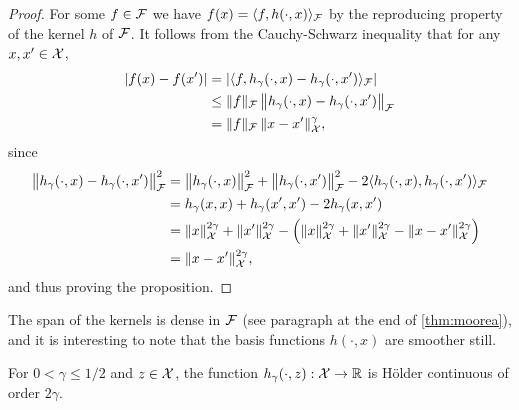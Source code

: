 \begin{proof}
  For some $f \in {\mathcal F}$ we have $f(x) = \langle f,h(\cdot,x)\rangle_{\mathcal F}$ by the reproducing property of the kernel $h$ of ${\mathcal F}$.
  It follows from the Cauchy-Schwarz inequality that for any $x,x'\in{\mathcal X}$,
  \begin{align*}
    \vert f(x) - f(x') \vert 
    &= \vert \langle f,h_\gamma(\cdot,x) - h_\gamma(\cdot,x')\rangle_{\mathcal F} \vert \\
    &\leq \lVert f\rVert_{\mathcal F} \, \big\Vert h_\gamma(\cdot,x) - h_\gamma(\cdot,x') \big\Vert_{\mathcal F} \\
    &= \lVert f\rVert_{\mathcal F} \, \lVert x-x'\rVert_{\mathcal X}^{\gamma},
  \end{align*}
  since
  \begin{align*}
    \big\Vert h_\gamma(\cdot,x) - h_\gamma(\cdot,x') \big\Vert_{\mathcal F} ^2
    &= \big\Vert h_\gamma(\cdot,x) \big\Vert_{\mathcal F} ^2 + \big\Vert h_\gamma(\cdot,x') \big\Vert_{\mathcal F} ^2 - 2 \langle h_\gamma(\cdot,x),h_\gamma(\cdot,x')\rangle_{\mathcal F} \\
    &= h_\gamma(x,x) + h_\gamma(x',x') - 2 h_\gamma(x,x') \\
    &= \lVert x\rVert_{\mathcal X}^{2\gamma} + \lVert x'\rVert_{\mathcal X}^{2\gamma} - \left( \lVert x\rVert_{\mathcal X}^{2\gamma} + \lVert x'\rVert_{\mathcal X}^{2\gamma} - \lVert x-x'\rVert_{\mathcal X}^{2\gamma} \right) \\
    &= \lVert x-x'\rVert_{\mathcal X}^{2\gamma},
  \end{align*}  
  and thus proving the proposition.
\end{proof}

The span of the kernels is dense in ${\mathcal F}$ (see paragraph at the end of \cref{thm:moorea}), and it is interesting to note that the basis functions $h(\cdot,x)$ are smoother still.

\begin{proposition}\label{thm:holderfbmIprior}
  For $0<\gamma\leq 1/2$ and $z\in{\mathcal X}$, the function $h_\gamma(\cdot,z):{\mathcal X}\to\mathbb{R}$ is Hölder continuous of order $2\gamma$.
\end{proposition}

